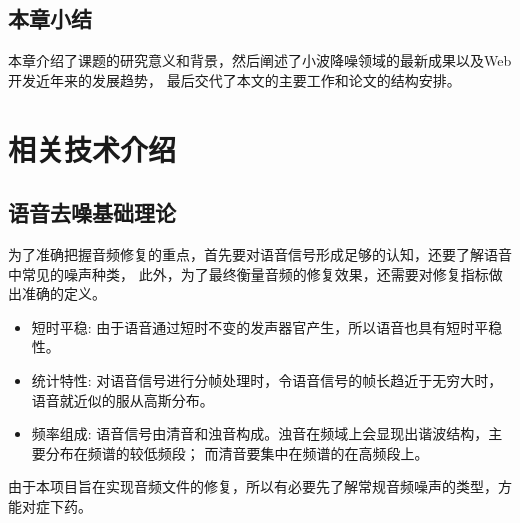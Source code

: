 \documentclass{morningstar}
\begin{document}
\subsection{本章小结}
本章介绍了课题的研究意义和背景，然后阐述了小波降噪领域的最新成果以及Web开发近年来的发展趋势，
最后交代了本文的主要工作和论文的结构安排。

\clearpage
\section{相关技术介绍}

\subsection{语音去噪基础理论}
为了准确把握音频修复的重点，首先要对语音信号形成足够的认知，还要了解语音中常见的噪声种类，
此外，为了最终衡量音频的修复效果，还需要对修复指标做出准确的定义。


\begin{itemize}
\item 短时平稳: 由于语音通过短时不变的发声器官产生，所以语音也具有短时平稳性。

\item 统计特性: 对语音信号进行分帧处理时，令语音信号的帧长趋近于无穷大时，语音就近似的服从高斯分布。

\item 频率组成: 语音信号由清音和浊音构成。浊音在频域上会显现出谐波结构，主要分布在频谱的较低频段；
而清音要集中在频谱的在高频段上。
\end{itemize}


由于本项目旨在实现音频文件的修复，所以有必要先了解常规音频噪声的类型，方能对症下药。
\end{document}
